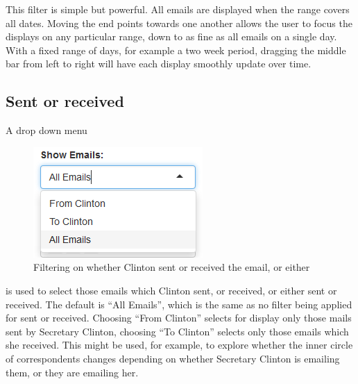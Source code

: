 \documentclass[journal]{vgtc}                %
\begin{document}
This filter is simple but powerful.  All emails are displayed when the range covers all dates.  Moving the end points towards one another allows the user to focus the displays on any particular range, down to as fine as all emails on a single day.  With a fixed range of days, for example a two week period,  dragging the middle bar from left to right will have each display smoothly update over time.
%
\subsection{Sent or received}
A drop down menu 
\begin{figure}[h]
\begin{center}
\includegraphics[width=0.35\linewidth]{ToFromImage}
\caption{Filtering on whether Clinton sent or received the email, or either}
\label{fig:toFromFilter}
\end{center}
\end{figure}
is used to select those emails which Clinton sent, or received, or either sent or received.  The default is ``All Emails'', which is the same as no filter being applied for sent or received.  Choosing ``From Clinton'' selects for display only those mails sent by Secretary Clinton, choosing ``To  Clinton'' selects only those emails which she received.  This might be used, for example, to explore whether the inner circle of correspondents changes depending on whether Secretary Clinton is emailing them, or they are emailing her.
\end{document}
